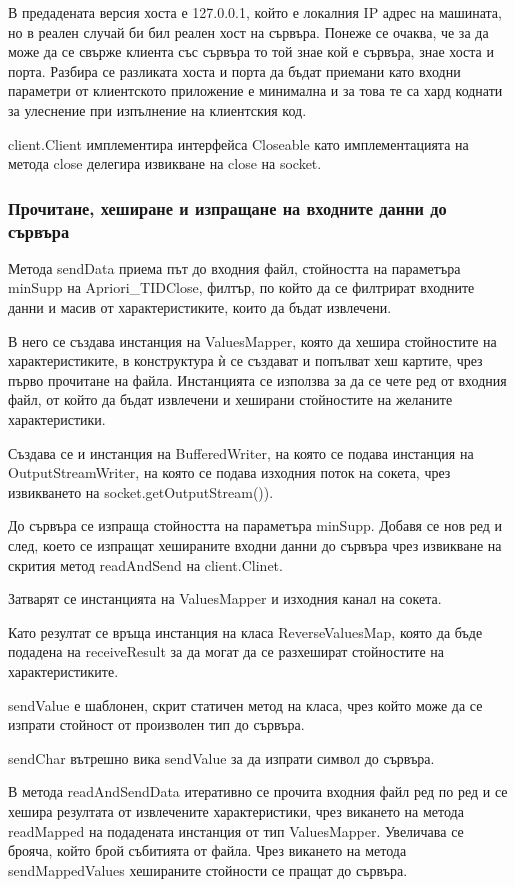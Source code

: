 \documentclass[a4paper, 12pt]{article}
\begin{document}
В предадената версия хоста е 127.0.0.1, който е локалния IP адрес на машината, но в реален случай би бил реален хост на сървъра.
Понеже се очаква, че за да може да се свърже клиента със сървъра то той знае кой е сървъра, знае хоста и порта.
Разбира се разликата хоста и порта да бъдат приемани като входни параметри от клиентското приложение е минимална
и за това те са хард коднати за улеснение при изпълнение на клиентския код.


client.Client имплементира интерфейса Closeable като имплементацията на метода close делегира извикване на close на socket.

\subsubsection{Прочитане, хеширане и изпращане на входните данни до сървъра}
Метода sendData приема път до входния файл, стойността на параметъра minSupp на Apriori\_TIDClose,
филтър, по който да се филтрират входните данни и масив от характеристиките, които да бъдат извлечени.

В него се създава инстанция на ValuesMapper, която да хешира стойностите на характеристиките,
в конструктура ѝ се създават и попълват хеш картите, чрез първо прочитане на файла.
Инстанцията се използва за да се чете ред от входния файл, от който да бъдат извлечени и хеширани стойностите на желаните характеристики.

Създава се и инстанция на BufferedWriter, на която се подава инстанция на OutputStreamWriter,
на която се подава изходния поток на сокета, чрез извикването на socket.getOutputStream()).

До сървъра се изпраща стойността на параметъра minSupp.
Добавя се нов ред и след, което се изпращат хешираните входни данни до сървъра чрез извикване на скрития метод readAndSend на client.Clinet.

Затварят се инстанцията на ValuesMapper и изходния канал на сокета.

Като резултат се връща инстанция на класа ReverseValuesMap,
която да бъде подадена на receiveResult за да могат да се разхешират стойностите на характеристиките.


sendValue е шаблонен, скрит статичен метод на класа,
чрез който може да се изпрати стойност от произволен тип до сървъра.

sendChar вътрешно вика sendValue за да изпрати символ до сървъра.

В метода readAndSendData итеративно се прочита входния файл ред по ред и се хешира резултата от извлечените характеристики,
чрез викането на метода readMapped на подадената инстанция от тип ValuesMapper.
Увеличава се брояча, който брой събитията от файла. 
Чрез викането на метода sendMappedValues хешираните стойности се пращат до сървъра.
\end{document}
